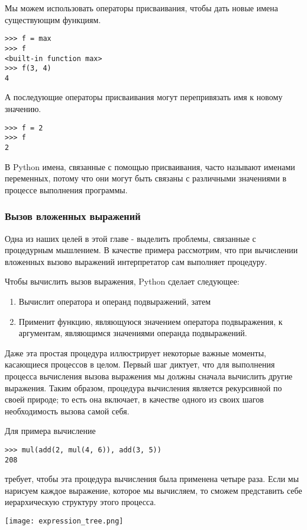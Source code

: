 Мы можем использовать операторы присваивания, чтобы дать новые имена существующим функциям.
\begin{verbatim}
>>> f = max
>>> f
<built-in function max>
>>> f(3, 4)
4
  \end{verbatim}

А последующие операторы присваивания могут перепривязать имя к новому значению.
\begin{verbatim}
>>> f = 2
>>> f
2
  \end{verbatim}

В Python имена, связанные с помощью присваивания, часто называют именами переменных, потому что они могут быть связаны с различными значениями в процессе выполнения программы.

\subsubsection{Вызов вложенных выражений}
Одна из наших целей в этой главе - выделить проблемы, связанные с процедурным мышлением.
В качестве примера рассмотрим, что при вычислении вложенных вызово выражений интерпретатор сам выполняет процедуру.

Чтобы вычислить вызов выражения, Python сделает следующее:
\begin{enumerate}
  \item Вычислит оператора и операнд подвыражений, затем
  \item Применит функцию, являющуюся значением оператора подвыражения, к аргументам, являющимся значениями операнда подвыражений.
\end{enumerate}

Даже эта простая процедура иллюстрирует некоторые важные моменты, касающиеся процессов в целом. Первый шаг диктует, что для выполнения процесса вычисления вызова выражения мы должны сначала вычислить другие выражения. Таким образом, процедура вычисления является рекурсивной по своей природе; то есть она включает, в качестве одного из своих шагов необходимость вызова самой себя.

Для примера вычисление
\begin{verbatim}
>>> mul(add(2, mul(4, 6)), add(3, 5))
208
\end{verbatim}

требует, чтобы эта процедура вычисления была применена четыре раза. Если мы нарисуем каждое выражение, которое мы вычисляем, то сможем представить себе иерархическую структуру этого процесса.
\begin{center}
  \texttt{[image: expression\_tree.png]}
\end{center}

